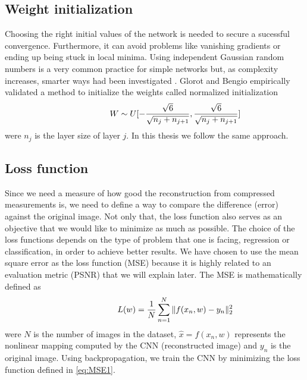 \subsection{Weight initialization}
Choosing the right initial values of the network is needed to secure a sucessful convergence. Furthermore, it can avoid problems like vanishing gradients or ending up being stuck in local minima. Using independent Gaussian random numbers is a very common practice for simple networks but, as complexity increases, smarter ways had been investigated \cite{glorot2010understanding}. Glorot and Bengio empirically validated a method to initialize the weights called normalized initialization 
\begin{equation} \label{eq:Initw1}
\centering
\hspace{3em} \hspace{3em} \hspace{3em} W \sim U [ - \frac{\sqrt{6}}{\sqrt{n_j + n_{j+1}}}, \frac{\sqrt{6}}{\sqrt{n_j + n_{j+1}}} ] \enspace \enspace \hspace{3em}
\end{equation}  
were $n_j$ is the layer size of layer $j$. In this thesis we follow the same approach.   

\FloatBarrier

\subsection{Loss function}
Since we need a measure of how good the reconstruction from compressed measurements is, we need to define a way to compare the difference (error) against the original image. Not only that, the loss function also serves as an objective that we would like to minimize as much as possible. The choice of the loss functions depends on the type of problem that one is facing, regression or classification, in order to achieve better results. We have chosen to use the mean square error as the loss function (MSE) because it is highly related to an evaluation metric (PSNR) that we will explain later. The MSE is mathematically defined as 
\begin{equation} \label{eq:MSE1}
\centering
\hspace{3em} \hspace{3em} \hspace{3em} L (w) = \frac{1}{N} \sum\limits_{n=1}^N \Vert f(x_n,w) - y_n\Vert_{2}^2 \enspace \enspace \hspace{3em}
\end{equation} 
were $N$ is the number of images in the dataset, $\hat{x} = f(x_n,w)$ represents the nonlinear mapping computed by the CNN (reconstructed image) and $y_n$ is the original image. Using backpropagation, we train the CNN by minimizing the loss function defined in \ref{eq:MSE1}.  

